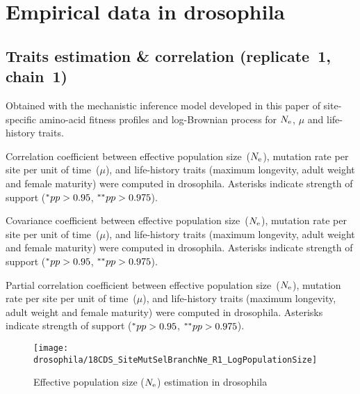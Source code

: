 \section{Empirical data in drosophila}
\label{sec:empirical-data-in-drosophila}

\subsection{Traits estimation \& correlation (replicate~1, chain~1)}
Obtained with the mechanistic inference model developed in this paper of site-specific amino-acid fitness profiles and log-Brownian process for $N_{\text{e}}$, $\mu$ and life-history traits.

\begin{table}[H]
    
    \caption[Correlation coefficient matrix in drosophila ($\omega$)]{
    Correlation coefficient between effective population size~($N_{\text{e}}$), mutation rate per site per unit of time~($\mu$), and life-history traits (maximum longevity, adult weight and female maturity) were computed in drosophila.
    Asterisks indicate strength of support ($\smash{^{*}} pp > 0.95$, $\smash{^{**}} pp > 0.975$).}
\end{table}

\begin{table}[H]
    
    \caption[Covariance matrix in drosophila]{
    Covariance coefficient between effective population size~($N_{\text{e}}$), mutation rate per site per unit of time~($\mu$), and life-history traits (maximum longevity, adult weight and female maturity) were computed in drosophila.
    Asterisks indicate strength of support ($\smash{^{*}} pp > 0.95$, $\smash{^{**}} pp > 0.975$).}
\end{table}

\begin{table}[H]
    
    \caption[Partial correlation coefficient matrix in drosophila]{
    Partial correlation coefficient between effective population size~($N_{\text{e}}$), mutation rate per site per unit of time~($\mu$), and life-history traits (maximum longevity, adult weight and female maturity) were computed in drosophila.
    Asterisks indicate strength of support ($\smash{^{*}} pp > 0.95$, $\smash{^{**}} pp > 0.975$).}
\end{table}

\begin{figure}[H]
    \centering
    \texttt{[image: drosophila/18CDS\_SiteMutSelBranchNe\_R1\_LogPopulationSize]}
    \caption[Effective population size estimation in drosophila]{Effective population size ($N_{\text{e}}$) estimation in drosophila}
\end{figure}

